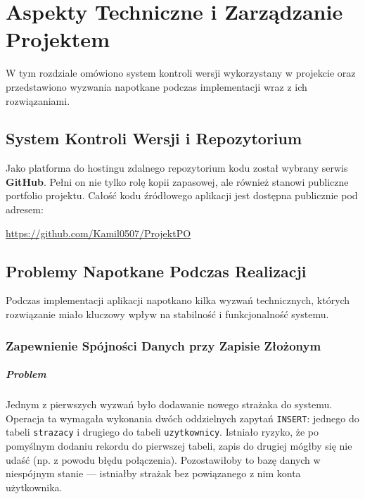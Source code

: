 \chapter{Aspekty Techniczne i Zarządzanie Projektem}
\label{chap:aspekty_techniczne}

W tym rozdziale omówiono system kontroli wersji wykorzystany w projekcie oraz przedstawiono wyzwania napotkane podczas implementacji wraz z ich rozwiązaniami.

\section{System Kontroli Wersji i Repozytorium}
\label{sec:git_repo}

Jako platforma do hostingu zdalnego repozytorium kodu został wybrany serwis \textbf{GitHub}. Pełni on nie tylko rolę kopii zapasowej, ale również stanowi publiczne portfolio projektu. Całość kodu źródłowego aplikacji jest dostępna publicznie pod adresem:
\begin{center}
    \url{https://github.com/Kamil0507/ProjektPO}
\end{center}

\section{Problemy Napotkane Podczas Realizacji}
\label{sec:problemy}

Podczas implementacji aplikacji napotkano kilka wyzwań technicznych, których rozwiązanie miało kluczowy wpływ na stabilność i funkcjonalność systemu.

\subsection{Zapewnienie Spójności Danych przy Zapisie Złożonym}
\label{ssec:problem_transakcje}

\paragraph{Problem} Jednym z pierwszych wyzwań było dodawanie nowego strażaka do systemu. Operacja ta wymagała wykonania dwóch oddzielnych zapytań \texttt{INSERT}: jednego do tabeli \texttt{strazacy} i drugiego do tabeli \texttt{uzytkownicy}. Istniało ryzyko, że po pomyślnym dodaniu rekordu do pierwszej tabeli, zapis do drugiej mógłby się nie udaść (np. z powodu błędu połączenia). Pozostawiłoby to bazę danych w niespójnym stanie — istniałby strażak bez powiązanego z nim konta użytkownika.

